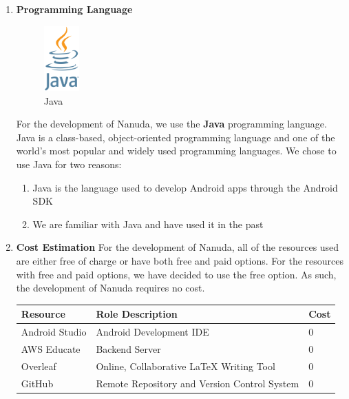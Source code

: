 \documentclass[conference]{IEEEtran}
\begin{document}
\begin{enumerate}
    \item \textbf{Programming Language}
        \newline
        \begin{figure}[htbp]
            \centerline{\includegraphics[height=25mm,scale=0.5]{img/logo-java.png}}
            \caption{Java}
            \label{fig:java-logo}
        \end{figure}
        \newline
        For the development of Nanuda, we use the \textbf{Java} programming language. Java is a class-based, object-oriented programming language and one of the world's most popular and widely used programming languages. We chose to use Java for two reasons:
        \begin{enumerate}
            \item Java is the language used to develop Android apps through the Android SDK
            \item We are familiar with Java and have used it in the past
        \end{enumerate}
    \item \textbf{Cost Estimation}
        \newline
        For the development of Nanuda, all of the resources used are either free of charge or have both free and paid options. For the resources with free and paid options, we have decided to use the free option. As such, the development of Nanuda requires no cost.
        \begin{center}
            \begin{tabular}{|p{6em}|p{10em}|p{4em}|}
                \hline
                \textbf{Resource} & \textbf{Role Description} & \textbf{Cost} \\
                \hline
                Android Studio & Android Development IDE & 0 \\
                \hline
                AWS Educate & Backend Server & 0 \\
                \hline
                Overleaf & Online, Collaborative LaTeX Writing Tool & 0 \\
                \hline
                GitHub & Remote Repository and Version Control System & 0 \\

\end{tabular}
\end{center}
\end{enumerate}
\end{document}
